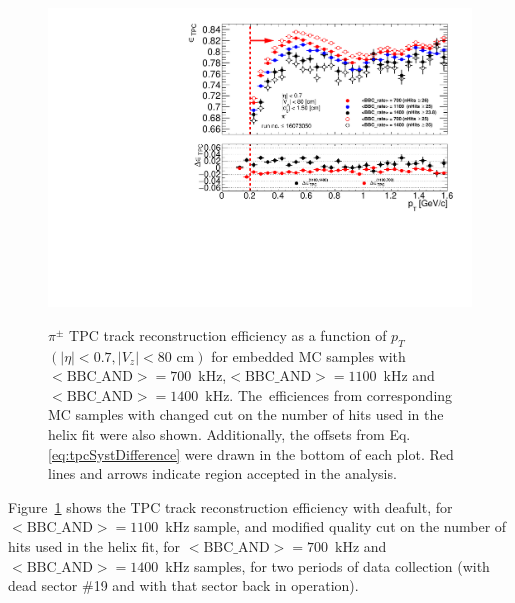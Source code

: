 \begin{figure}[b!]
{	}~
	\parbox{0.495\textwidth}{
		\centering
		\includegraphics[width=\linewidth,page=4]{graphics/systematicsEfficiency/bbc_and/tpcEffi.pdf}\\
	}
	\caption[$\pi^\pm$ TPC track reconstruction efficiency as a function of $p_T$ $\left(|\eta|<0.7, |V_z|<80\text{ cm}\right)$ for embedded MC samples with \mbox{$<\text{BBC\_AND}>=700$~kHz} and \mbox{$<\text{BBC\_AND}>=1400$~kHz}]{$\pi^\pm$ TPC track reconstruction efficiency as a function of $p_T$ $\left(|\eta|<0.7, |V_z|<80\text{ cm}\right)$ for embedded MC samples with \mbox{$<\text{BBC\_AND}>=700$~kHz},\mbox{$<\text{BBC\_AND}>=1100$~kHz} and \mbox{$<\text{BBC\_AND}>=1400$~kHz}. The~efficiences from corresponding MC samples with changed cut on the number of hits used in the helix fit were also shown. Additionally, the offsets  from Eq. \ref{eq:tpcSystDifference} were drawn in the bottom of each plot. Red lines and arrows indicate region accepted in the analysis.}
	\label{fig:systError1Dtpc}
\end{figure}

Figure~\ref{fig:systError1Dtpc} shows the TPC track reconstruction efficiency with deafult, for   \mbox{$<\text{BBC\_AND}>=1100$~kHz} sample, and modified quality cut on the number of hits used in the helix fit, for \mbox{$<\text{BBC\_AND}>=700$~kHz} and \mbox{$<\text{BBC\_AND}>=1400$~kHz} samples, for two periods of data collection (with dead sector \#19 and with that sector back in operation). 



